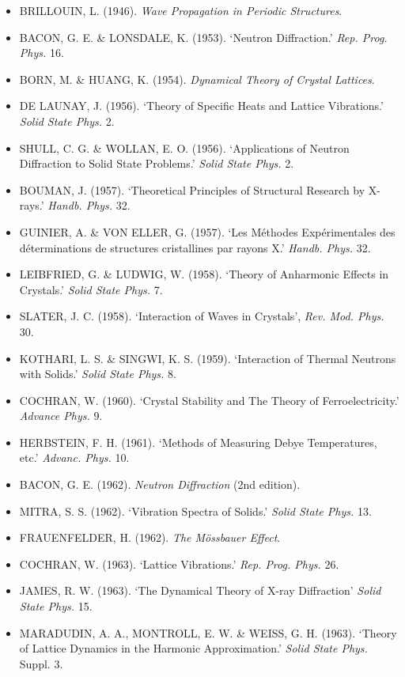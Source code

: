 \begin{itemize}[leftmargin=2em, itemsep=0.2em]
\item BRILLOUIN, L. (1946). \emph{Wave Propagation in Periodic Structures}.
\item BACON, G. E. \& LONSDALE, K. (1953). `Neutron Diffraction.' \emph{Rep. Prog. Phys.} 16.
\item BORN, M. \& HUANG, K. (1954). \emph{Dynamical Theory of Crystal Lattices}.
\item DE LAUNAY, J. (1956). `Theory of Specific Heats and Lattice Vibrations.' \emph{Solid State Phys.} 2.
\item SHULL, C. G. \& WOLLAN, E. O. (1956). `Applications of Neutron Diffraction to Solid State Problems.' \emph{Solid State Phys.} 2.
\item BOUMAN, J. (1957). `Theoretical Principles of Structural Research by X-rays.' \emph{Handb. Phys.} 32.
\item GUINIER, A. \& VON ELLER, G. (1957). `Les Méthodes Expérimentales des déterminations de structures cristallines par rayons X.' \emph{Handb. Phys.} 32.
\item LEIBFRIED, G. \& LUDWIG, W. (1958). `Theory of Anharmonic Effects in Crystals.' \emph{Solid State Phys.} 7.
\item SLATER, J. C. (1958). `Interaction of Waves in Crystals', \emph{Rev. Mod. Phys.} 30.
\item KOTHARI, L. S. \& SINGWI, K. S. (1959). `Interaction of Thermal Neutrons with Solids.' \emph{Solid State Phys.} 8.
\item COCHRAN, W. (1960). `Crystal Stability and The Theory of Ferroelectricity.' \emph{Advance Phys.} 9.
\item HERBSTEIN, F. H. (1961). `Methods of Measuring Debye Temperatures, etc.' \emph{Advanc. Phys.} 10.
\item BACON, G. E. (1962). \emph{Neutron Diffraction} (2nd edition).
\item MITRA, S. S. (1962). `Vibration Spectra of Solids.' \emph{Solid State Phys.} 13.
\item FRAUENFELDER, H. (1962). \emph{The Mössbauer Effect}.
\item COCHRAN, W. (1963). `Lattice Vibrations.' \emph{Rep. Prog. Phys.} 26.
\item JAMES, R. W. (1963). `The Dynamical Theory of X-ray Diffraction' \emph{Solid State Phys.} 15.
\item MARADUDIN, A. A., MONTROLL, E. W. \& WEISS, G. H. (1963). `Theory of Lattice Dynamics in the Harmonic Approximation.' \emph{Solid State Phys.} Suppl. 3.

\end{itemize}
